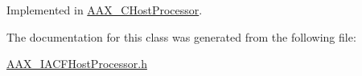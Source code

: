 Implemented in \mbox{\hyperlink{a01485_afe000adf46a85258652a1da8e9cdf822}{A\+A\+X\+\_\+\+C\+Host\+Processor}}.



The documentation for this class was generated from the following file\+:\begin{DoxyCompactItemize}
\item 
\mbox{\hyperlink{a00536}{A\+A\+X\+\_\+\+I\+A\+C\+F\+Host\+Processor.\+h}}\end{DoxyCompactItemize}
